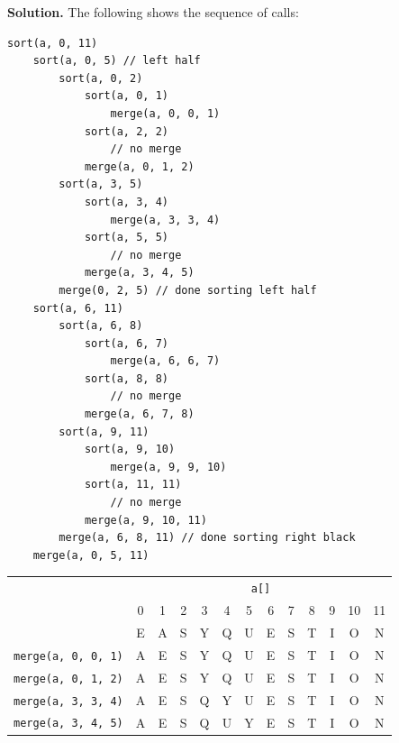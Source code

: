 \documentclass[12pt, a4paper]{article}
\newenvironment{sol}[1][Solution]
{\par\medskip\noindent \textbf{#1.} }
{\medskip}
\begin{document}
	\begin{sol}
		The following shows the sequence of calls:
		\begin{lstlisting}[language={}]
sort(a, 0, 11)
	sort(a, 0, 5) // left half
		sort(a, 0, 2)
			sort(a, 0, 1)
				merge(a, 0, 0, 1)
			sort(a, 2, 2)
				// no merge
			merge(a, 0, 1, 2)
		sort(a, 3, 5)
			sort(a, 3, 4)
				merge(a, 3, 3, 4)
			sort(a, 5, 5)
				// no merge
			merge(a, 3, 4, 5)
		merge(0, 2, 5) // done sorting left half
	sort(a, 6, 11)
		sort(a, 6, 8)
			sort(a, 6, 7)
				merge(a, 6, 6, 7)
			sort(a, 8, 8)
				// no merge
			merge(a, 6, 7, 8)
		sort(a, 9, 11)
			sort(a, 9, 10)
				merge(a, 9, 9, 10)
			sort(a, 11, 11)
				// no merge
			merge(a, 9, 10, 11)
		merge(a, 6, 8, 11) // done sorting right black
	merge(a, 0, 5, 11)
		\end{lstlisting}
		\begin{center}
			\begin{tabular}{c|cccccccccccc}
				{} & \multicolumn{12}{c}{\texttt{a[]}}\\
				{} & 0 & 1 & 2 & 3 & 4 & 5 & 6 & 7 & 8 & 9 & 10 & 11 \\
				\hline
				{} & E & A & S & Y & Q & U & E & S & T & I & O & N \\
				
				\texttt{merge(a, {\color{red}0}, 0, {\color{red}1})}
				& A & E & {\color{gray}S} & {\color{gray}Y} & {\color{gray}Q} & {\color{gray}U} & {\color{gray}E} & {\color{gray}S} & {\color{gray}T} & {\color{gray}I} & {\color{gray}O} & {\color{gray}N}\\
				
				\texttt{merge(a, {\color{red}0}, 1, {\color{red}2})}
				& {\color{black}A} & {\color{black}E} & {\color{black}S} & {\color{gray}Y} & {\color{gray}Q} & {\color{gray}U} & {\color{gray}E} & {\color{gray}S} & {\color{gray}T} & {\color{gray}I} & {\color{gray}O} & {\color{gray}N}\\
				
				\texttt{merge(a, {\color{red}3}, 3, {\color{red}4})}
				& {\color{gray}A} & {\color{gray}E} & {\color{gray}S} & {\color{black}Q} & {\color{black}Y} & {\color{gray}U} & {\color{gray}E} & {\color{gray}S} & {\color{gray}T} & {\color{gray}I} & {\color{gray}O} & {\color{gray}N}\\
				
				\texttt{merge(a, {\color{red}3}, 4, {\color{red}5})}
				& {\color{gray}A} & {\color{gray}E} & {\color{gray}S} & {\color{black}Q} & {\color{black}U} & {\color{black}Y} & {\color{gray}E} & {\color{gray}S} & {\color{gray}T} & {\color{gray}I} & {\color{gray}O} & {\color{gray}N}\\
				

\end{tabular}
\end{center}
\end{sol}
\end{document}
